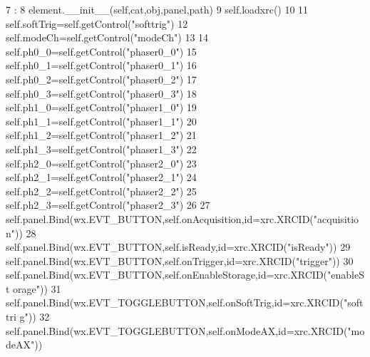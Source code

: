 \begin{DoxyCode}
7                                              :
8         element.__init__(self,cat,obj,panel,path)
9         self.loadxrc()
10                 
11         self.softTrig=self.getControl("softtrig")
12         self.modeCh=self.getControl("modeCh")
13 
14         self.ph0_0=self.getControl("phaser0_0")
15         self.ph0_1=self.getControl("phaser0_1")
16         self.ph0_2=self.getControl("phaser0_2")
17         self.ph0_3=self.getControl("phaser0_3")
18         self.ph1_0=self.getControl("phaser1_0")
19         self.ph1_1=self.getControl("phaser1_1")
20         self.ph1_2=self.getControl("phaser1_2")
21         self.ph1_3=self.getControl("phaser1_3")
22         self.ph2_0=self.getControl("phaser2_0")
23         self.ph2_1=self.getControl("phaser2_1")
24         self.ph2_2=self.getControl("phaser2_2")
25         self.ph2_3=self.getControl("phaser2_3")
26         
27         self.panel.Bind(wx.EVT_BUTTON,self.onAcquisition,id=xrc.XRCID("acquisitio
      n"))
28         self.panel.Bind(wx.EVT_BUTTON,self.isReady,id=xrc.XRCID("isReady"))
29         self.panel.Bind(wx.EVT_BUTTON,self.onTrigger,id=xrc.XRCID("trigger"))
30         self.panel.Bind(wx.EVT_BUTTON,self.onEnableStorage,id=xrc.XRCID("enableSt
      orage"))
31         self.panel.Bind(wx.EVT_TOGGLEBUTTON,self.onSoftTrig,id=xrc.XRCID("softtri
      g"))
32         self.panel.Bind(wx.EVT_TOGGLEBUTTON,self.onModeAX,id=xrc.XRCID("modeAX"))
      

\end{DoxyCode}
